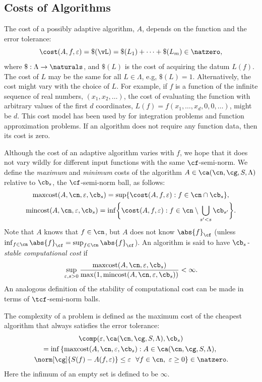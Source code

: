 \documentclass[]{elsarticle}
\DeclareMathOperator{\maxcost}{maxcost}
\DeclareMathOperator{\mincost}{mincost}
\theoremstyle{definition}
\theoremstyle{remark}
\newcommand{\Fnorm}[1]{\abs{#1}_{\cf}}
\begin{document}
\subsection{Costs of Algorithms} \label{AlgoCostsec}

The cost of a possibly adaptive algorithm, $A$, depends on the function and the error tolerance: 
\[
\cost(A,f,\varepsilon) = \$(\vL) = \$(L_1) + \cdots +\$(L_m) \in \natzero,
\]
where $\$:\Lambda \to \naturals$, and $\$(L)$ is the cost of acquiring the datum $L(f)$. The cost of $L$ may be the same for all $L \in \Lambda$, e.g, $\$(L)=1$.  Alternatively, the cost might vary with the choice of $L$.  For example, if $f$ is a function of the infinite sequence of real numbers, $(x_1, x_2, \ldots)$, the cost of evaluating the function with arbitrary values of the first $d$ coordinates, $L(f)=f(x_1, \ldots, x_d, 0, 0, \ldots)$, might be $d$.  This cost model has been used by for integration problems \cite{HicMGRitNiu09a,KuoEtal10a,NiuHic09a,NiuHic09b,PlaWas11a} and function approximation problems\cite{Was13a,WasWoz11a,WasWoz11b}.  If an algorithm does not require any function data, then its cost is zero.

Although the cost of an adaptive algorithm varies with $f$, we hope that it does not vary wildly for different input functions with the same $\cf$-semi-norm. We define the \emph{maximum} and \emph{minimum} costs of the algorithm $A\in \ca(\cn,\cg,S,\Lambda)$ relative to $\cb_{s}$, the $\cf$-semi-norm ball, as follows:
\begin{gather*}
\maxcost(A,\cn,\varepsilon,\cb_s)
= \sup \{ \cost(A,f,\varepsilon) : f \in \cn \cap \cb_{s} \}, \\ \mincost(A,\cn,\varepsilon,\cb_s)
= \inf \biggl \{ \cost(A,f,\varepsilon) : f \in \cn\setminus \bigcup_{s'<s}\cb_{s'} \biggr \} .
\end{gather*}
Note that $A$ knows that $f \in \cn$, but $A$ does not know $\Fnorm{f}$ (unless $\inf_{f \in \cn} \Fnorm{f}=\sup_{f \in \cn} \Fnorm{f}$).  An algorithm is said to have \emph{$\cb_{s}$-stable computational cost} if 
\begin{equation*}\label{coststabledef}
\sup_{\varepsilon, s > 0} \frac{\maxcost(A,\cn,\varepsilon,\cb_s)}{\max(1,\mincost(A,\cn,\varepsilon, \cb_s))} < \infty.
\end{equation*} 
An analogous definition of the stability of computational cost can be made in terms of $\tcf$-semi-norm balls.

The complexity of a problem is defined as the maximum cost of the cheapest algorithm that always satisfies the error tolerance:
\begin{multline*}
\comp(\varepsilon,\ca(\cn,\cg,S,\Lambda),\cb_s) \\
 = \inf\left\{\maxcost(A,\cn,\varepsilon,\cb_s) : A \in \ca(\cn,\cg,S,\Lambda), \right. \\
 \left . \norm[\cg]{S(f)-A(f,\varepsilon)} \le \varepsilon \ \ \forall f \in \cn, \ \varepsilon \ge 0 \right \} \in \natzero.
\end{multline*}
Here the infimum of an empty set is defined to be $\infty$.  
\end{document}
